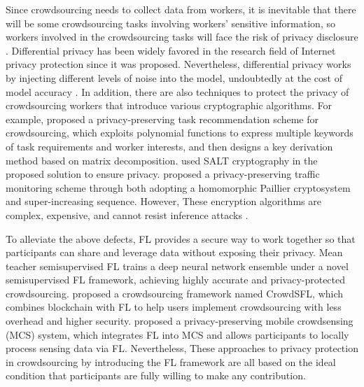 \documentclass[final,1p,times]{elsarticle}
\begin{document}
Since crowdsourcing needs to collect data from workers, it is inevitable that there will be some crowdsourcing tasks involving workers' sensitive information, so workers involved in the crowdsourcing tasks will face the risk of privacy disclosure \citep{wu2019bptm,zhang2020decentralized}. Differential privacy \citep{dwork2006differential} has been widely favored in the research field of Internet privacy protection since it was proposed. Nevertheless, differential privacy works by injecting different levels of noise into the model, undoubtedly at the cost of model accuracy \citep{bagdasaryan2019differential}. In addition, there are also techniques to protect the privacy of crowdsourcing workers that introduce various cryptographic algorithms. For example, \cite{shu2018privacy} proposed a privacy-preserving task recommendation scheme for crowdsourcing, which exploits polynomial functions to express multiple keywords of task requirements and worker interests, and then designs a key derivation method based on matrix decomposition. \cite{joshi2020salt} used SALT cryptography in the proposed solution to ensure privacy. \cite{zhang2019privacy} proposed a privacy-preserving traffic monitoring scheme through both adopting a homomorphic Paillier cryptosystem and super-increasing sequence. However, These encryption algorithms are complex, expensive, and cannot resist inference attacks \citep{lin2020secbcs,wang2019towards}.

To alleviate the above defects, FL provides a secure way to work together so that participants can share and leverage data without exposing their privacy. Mean teacher semisupervised FL \citep{zhang2021toward} trains a deep neural network ensemble under a novel semisupervised FL framework, achieving highly accurate and privacy-protected crowdsourcing. \cite{li2020crowdsf} proposed a crowdsourcing framework named CrowdSFL, which combines blockchain with FL to help users implement crowdsourcing with less overhead and higher security. \cite{zhao2021crowdsensing} proposed a privacy-preserving mobile crowdsensing (MCS) system, which integrates FL into MCS and allows participants to locally process sensing data via FL. Nevertheless, These approaches to privacy protection in crowdsourcing by introducing the FL framework are all based on the ideal condition that participants are fully willing to make any contribution.
\end{document}

